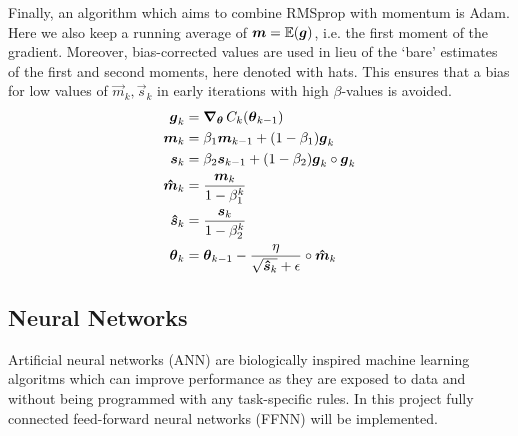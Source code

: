         Finally, an algorithm which aims to combine RMSprop with momentum is Adam. Here we also keep a running average of $\boldsymbol{m} = \operatorname{\mathbb{E}}(\boldsymbol{g})$, i.e. the first moment of the gradient. Moreover, bias-corrected values are used in lieu of the `bare' estimates of the first and second moments, here denoted with hats. This ensures that a bias for low values of $\vec{m}_k, \vec{s}_k$ in early iterations with high $\beta$-values is avoided.
        \begin{subequations}
            \begin{align}
                \boldsymbol{g}_k &= \operatorname{\operatorname{\boldsymbol{\nabla}}_{\boldsymbol{\theta}}} C_k(\boldsymbol{\theta}_{k-1}) \\
                \boldsymbol{m}_k &= \beta_1 \boldsymbol{m}_{k-1} + (1-\beta_1) \boldsymbol{g}_k \\
                \boldsymbol{s}_k &= \beta_2 \boldsymbol{s}_{k-1} + (1-\beta_2) \boldsymbol{g}_k \circ \boldsymbol{g}_k \\
                \boldsymbol{\hat{m}}_k &= \frac{\boldsymbol{m}_k}{1-\beta_1^k} \\
                \boldsymbol{\hat{s}}_k &= \frac{\boldsymbol{s}_k}{1-\beta_2^k} \\
                \boldsymbol{\theta}_k &= \boldsymbol{\theta}_{k-1} - \frac{\eta}{\sqrt{\boldsymbol{\hat{s}}_k}+\epsilon} \circ \boldsymbol{\hat{m}}_k
            \end{align}
        \end{subequations}



    \subsection{Neural Networks}
        Artificial neural networks (ANN) are biologically inspired machine learning algoritms which can improve performance as they are exposed to data and without being programmed with any task-specific rules. In this project fully connected feed-forward neural networks (FFNN) will be implemented. 
